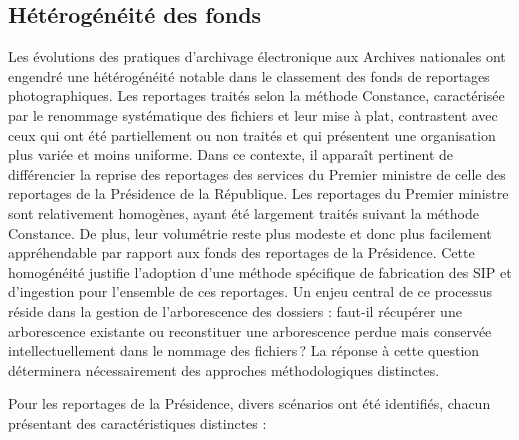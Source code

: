 \subsection*{Hétérogénéité des fonds}

Les évolutions des pratiques d’archivage électronique aux Archives nationales ont engendré une hétérogénéité notable dans le classement des fonds de reportages photographiques. Les reportages traités selon la méthode Constance, caractérisée par le renommage systématique des fichiers et leur mise à plat, contrastent avec ceux qui ont été partiellement ou non traités et qui présentent une organisation plus variée et moins uniforme. Dans ce contexte, il apparaît pertinent de différencier la reprise des reportages des services du Premier ministre de celle des reportages de la Présidence de la République. Les reportages du Premier ministre sont relativement homogènes, ayant été largement traités suivant la méthode Constance. De plus, leur volumétrie reste plus modeste et donc plus facilement appréhendable par rapport aux fonds des reportages de la Présidence. Cette homogénéité justifie l'adoption d'une méthode spécifique de fabrication des SIP et d’ingestion pour l’ensemble de ces reportages. Un enjeu central de ce processus réside dans la gestion de l’arborescence des dossiers : faut-il récupérer une arborescence existante ou reconstituer une arborescence perdue mais conservée intellectuellement dans le nommage des fichiers ? La réponse à cette question déterminera nécessairement des approches méthodologiques distinctes.

Pour les reportages de la Présidence, divers scénarios ont été identifiés, chacun présentant des caractéristiques distinctes :

